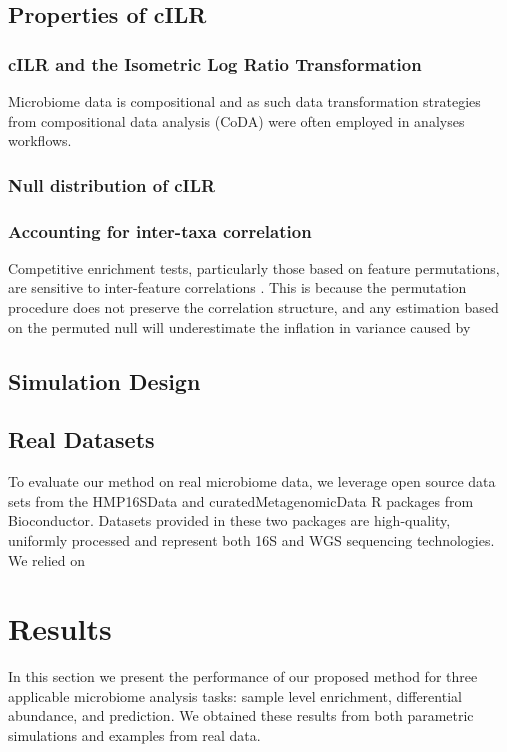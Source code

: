 \documentclass{article}
\begin{document}
\subsection*{Properties of cILR}
\subsubsection*{cILR and the Isometric Log Ratio Transformation}
Microbiome data is compositional \cite{gloor2017} and as such data transformation strategies from compositional data analysis (CoDA) \cite{aitchison} were often employed in analyses workflows. 
\subsubsection*{Null distribution of cILR}
\subsubsection*{Accounting for inter-taxa correlation}
Competitive enrichment tests, particularly those based on feature permutations, are sensitive to inter-feature correlations \cite{wu2012}. This is because the permutation procedure does not preserve the correlation structure, and any estimation based on the permuted null will underestimate the inflation in variance caused by

\subsection*{Simulation Design}
\subsection*{Real Datasets}
To evaluate our method on real microbiome data, we leverage open source data sets from the HMP16SData \cite{schiffer2019} and curatedMetagenomicData \cite{pasolli2017} R packages from Bioconductor. Datasets provided in these two packages are high-quality, uniformly processed and represent both 16S and WGS sequencing technologies.  
We relied on 

\section*{Results}
In this section we present the performance of our proposed method for three applicable microbiome analysis tasks: sample level enrichment, differential abundance, and prediction. We obtained these results from both parametric simulations and examples from real data.  
\end{document}
